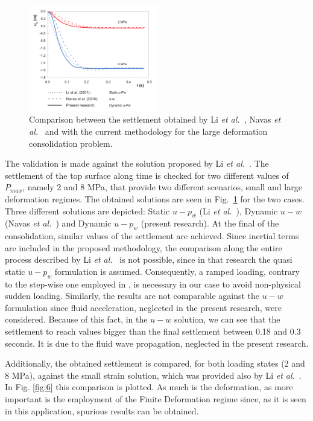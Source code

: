 \documentclass[twocolumn]{svjour3}          %
\begin{document}
\begin{figure}
  \includegraphics[width=0.5\textwidth]{Fig/borja.pdf}
\caption{Comparison between the settlement obtained by Li \textit{et al.}~\cite{LiBorja2004}, Navas \textit{et al.}~\cite{Navas:17b} and with the current methodology for the large deformation consolidation problem.}
\label{fig:5}      
\end{figure}
The validation is made against the solution proposed by Li \textit{et al.}~\cite{LiBorja2004}. The settlement of the top surface along time is checked for two different values of $P_{max}$, namely 2 and 8 MPa, that provide two different scenarios, small and large deformation regimes. The obtained solutions are seen in Fig.~\ref{fig:5} for the two cases. Three different solutions are depicted: Static $u-p_w$ (Li \textit{et al.}~\cite{LiBorja2004}), Dynamic $u-w$ (Navas \textit{et al.}~\cite{Navas:17b}) and Dynamic $u-p_w$ (present research). At the final of the consolidation, similar values of the settlement are achieved. Since inertial terms are included in the proposed methodology, the comparison along the entire process described by Li \textit{et al.}~\cite{LiBorja2004} is not possible, since in that research the quasi static $u-p_w$ formulation is assumed. Consequently, a ramped loading, contrary to the step-wise one employed in \cite{LiBorja2004}, is necessary in our case  to avoid non-physical sudden loading. Similarly, the results are not comparable against the $u-w$ formulation since fluid acceleration, neglected in the present research, were considered. Because of this fact, in the $u-w$ solution, we can see that the settlement to reach values bigger than the final settlement between 0.18 and 0.3 seconds. It is due to the fluid wave propagation, neglected in the present research.

Additionally, the obtained settlement is compared, for both loading states (2 and 8 MPa),  against the small strain solution, which was provided also by Li \textit{et al.}~\cite{LiBorja2004}. In Fig. \ref{fig:6} this comparison is plotted. As much is the deformation, as more important is the employment of the Finite Deformation regime since, as it is seen in this application, spurious results can be obtained.
\end{document}
